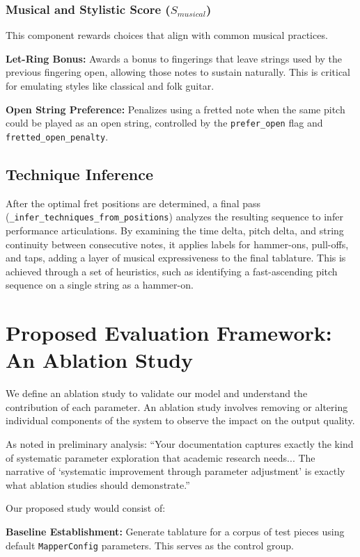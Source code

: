 \documentclass[conference]{IEEEtran}
\begin{document}
\subsubsection{Musical and Stylistic Score ($S_{musical}$)}
This component rewards choices that align with common musical practices.

\textbf{Let-Ring Bonus:} Awards a bonus to fingerings that leave strings used by the previous fingering open, allowing those notes to sustain naturally. This is critical for emulating styles like classical and folk guitar.

\textbf{Open String Preference:} Penalizes using a fretted note when the same pitch could be played as an open string, controlled by the \texttt{prefer\_open} flag and \texttt{fretted\_open\_penalty}.

\subsection{Technique Inference}

After the optimal fret positions are determined, a final pass (\texttt{\_infer\_techniques\_from\_positions}) analyzes the resulting sequence to infer performance articulations. By examining the time delta, pitch delta, and string continuity between consecutive notes, it applies labels for hammer-ons, pull-offs, and taps, adding a layer of musical expressiveness to the final tablature. This is achieved through a set of heuristics, such as identifying a fast-ascending pitch sequence on a single string as a hammer-on.

\section{Proposed Evaluation Framework: An Ablation Study}

We define an ablation study to validate our model and understand the contribution of each parameter. An ablation study involves removing or altering individual components of the system to observe the impact on the output quality.

As noted in preliminary analysis: ``Your documentation captures exactly the kind of systematic parameter exploration that academic research needs... The narrative of `systematic improvement through parameter adjustment' is exactly what ablation studies should demonstrate.''

Our proposed study would consist of:

\textbf{Baseline Establishment:} Generate tablature for a corpus of test pieces using default \texttt{MapperConfig} parameters. This serves as the control group.
\end{document}

